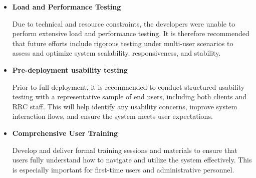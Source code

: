 \begin{itemize}
	
	\item \textbf{Load and Performance Testing}
	
	Due to technical and resource constraints, the developers were unable to perform extensive load and performance testing. It is therefore recommended that future efforts include rigorous testing under multi-user scenarios to assess and optimize system scalability, responsiveness, and stability.
	
	
	\item \textbf{Pre-deployment usability testing}
	
	Prior to full deployment, it is recommended to conduct structured usability testing with a representative sample of end users, including both clients and RRC staff. This will help identify any usability concerns, improve system interaction flows, and ensure the system meets user expectations.
	
	\item \textbf{Comprehensive User Training}
	
	Develop and deliver formal training sessions and materials to ensure that users fully understand how to navigate and utilize the system effectively. This is especially important for first-time users and administrative personnel.
	
\end{itemize}